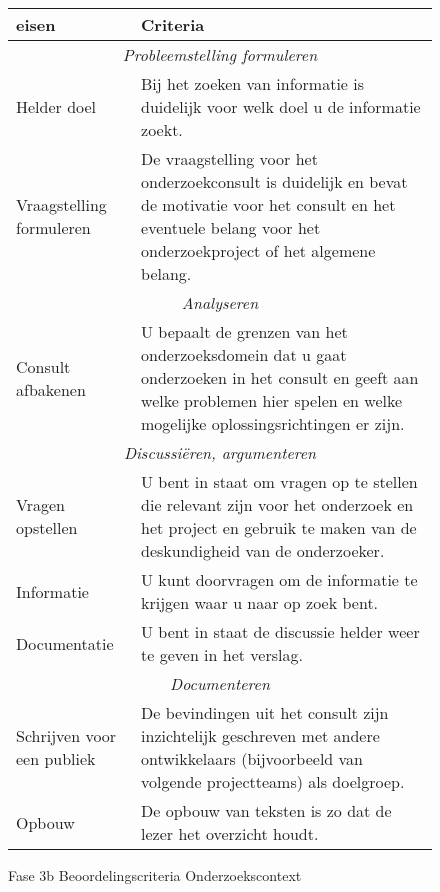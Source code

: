 \begin{figure}[p]
    \centering
    {
	\small\sf
	\begin{tabular}{|p{7em}|p{23em}|}
	    \hline {\bf eisen} & {\bf Criteria}\\\hline
	    \multicolumn{2}{|c|}{\emph{Probleemstelling formuleren}}\\\hline
	    Helder doel & Bij het zoeken van informatie is duidelijk voor welk doel u de informatie
		    zoekt.
	    \\\hline
	    Vraagstelling formuleren & De vraagstelling voor het onderzoekconsult is duidelijk en bevat de
		    motivatie voor het consult en het eventuele belang voor het onderzoekproject of
		    het algemene belang.
	    \\\hline
	    \multicolumn{2}{|c|}{\emph{Analyseren}}\\\hline
	    Consult afbakenen & U bepaalt de grenzen van het onderzoeksdomein dat u gaat onderzoeken in het
		    consult en geeft aan welke problemen hier spelen en welke mogelijke
		    oplossingsrichtingen er zijn.
	    \\\hline
	    \multicolumn{2}{|c|}{\emph{Discussi\"{e}ren, argumenteren}}\\\hline
	    Vragen opstellen & U bent in staat om vragen op te stellen die relevant zijn voor het onderzoek
		    en het project en gebruik te maken van de deskundigheid van de onderzoeker.
	    \\\hline
	    Informatie & U kunt doorvragen om de informatie te krijgen waar u naar op zoek bent.
	    \\\hline
	    Documentatie & U bent in staat de discussie helder weer te geven in het verslag.
	    \\\hline
	    \multicolumn{2}{|c|}{\emph{Documenteren}}\\\hline
	    Schrijven voor een publiek & De bevindingen uit het consult zijn inzichtelijk geschreven met andere
		    ontwikkelaars (bijvoorbeeld van volgende projectteams) als doelgroep.
	    \\\hline
	    Opbouw & De opbouw van teksten is zo dat de lezer het overzicht houdt.
	    \\\hline
	\end{tabular}
    }%

    \caption{Fase 3b Beoordelingscriteria Onderzoekscontext}
    \label{fig: 3b beoordelingscriteria}
\end{figure}
